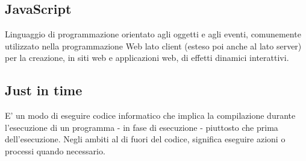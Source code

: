 \documentclass[../glossario.tex]{subfiles}
\begin{document}
\subsection*{JavaScript}
Linguaggio di programmazione orientato agli oggetti e agli eventi, comunemente utilizzato nella programmazione Web lato client (esteso poi anche al lato server) per la creazione, in siti web e applicazioni web, di effetti dinamici interattivi.

\subsection*{Just in time}
E' un modo di eseguire codice informatico che implica la compilazione durante l'esecuzione di un programma - in fase di esecuzione - piuttosto che prima dell'esecuzione. Negli ambiti al di fuori del codice, significa eseguire azioni o processi quando necessario.
    
\end{document}
